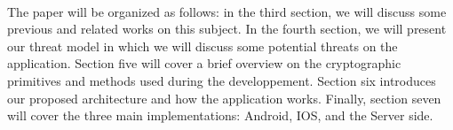    \paragraph{}
    The paper will be organized as follows: in the third section, we will discuss some previous and related works on this subject. In the fourth section, we will present our threat model in which we will discuss some potential threats on the application. Section five will cover a brief overview on the cryptographic primitives and methods used during the developpement. Section six introduces our proposed architecture and how the application works. Finally, section seven will cover the three main implementations: Android, IOS, and the Server side.  